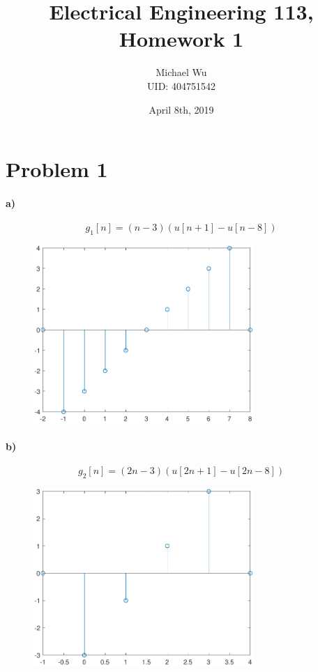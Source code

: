 \documentclass[12pt]{article}
\begin{document}
\title{Electrical Engineering 113, Homework 1}
\date{April 8th, 2019}
\author{Michael Wu\\UID: 404751542}
\maketitle

\section*{Problem 1}

\paragraph{a)}

\[g_1[n]=(n-3)(u[n+1]-u[n-8])\]
\begin{figure}[H]
    \begin{center}
        \includegraphics[width=3.3in]{problem1a.pdf}
    \end{center}
\end{figure}

\pagebreak

\paragraph{b)}

\[g_2[n]=(2n-3)(u[2n+1]-u[2n-8])\]
\begin{figure}[H]
    \begin{center}
        \includegraphics[width=3.3in]{problem1b.pdf}
    \end{center}
\end{figure}
\end{document}
